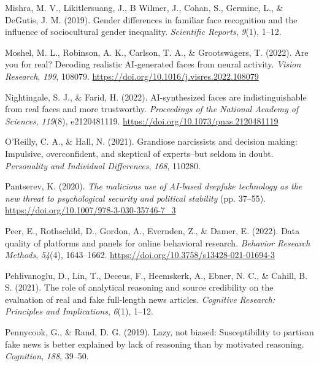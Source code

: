 \documentclass[
  man,floatsintext]{apa6}
\newlength{\cslhangindent}
\newlength{\cslentryspacingunit} %
\newenvironment{CSLReferences}[2] %
 {%
  \setlength{\parindent}{0pt}
  \ifodd #1
  \let\oldpar\par
  \def\par{\hangindent=\cslhangindent\oldpar}
  \fi
  \setlength{\parskip}{#2\cslentryspacingunit}
 }%
 {}
\begin{document}
\begin{CSLReferences}{1}{0}
\leavevmode{}%
Mishra, M. V., Likitlersuang, J., B Wilmer, J., Cohan, S., Germine, L., \& DeGutis, J. M. (2019). Gender differences in familiar face recognition and the influence of sociocultural gender inequality. \emph{Scientific Reports}, \emph{9}(1), 1--12.

\leavevmode{}%
Moshel, M. L., Robinson, A. K., Carlson, T. A., \& Grootswagers, T. (2022). Are you for real? Decoding realistic AI-generated faces from neural activity. \emph{Vision Research}, \emph{199}, 108079. \url{https://doi.org/10.1016/j.visres.2022.108079}

\leavevmode{}%
Nightingale, S. J., \& Farid, H. (2022). AI-synthesized faces are indistinguishable from real faces and more trustworthy. \emph{Proceedings of the National Academy of Sciences}, \emph{119}(8), e2120481119. \url{https://doi.org/10.1073/pnas.2120481119}

\leavevmode{}%
O'Reilly, C. A., \& Hall, N. (2021). Grandiose narcissists and decision making: Impulsive, overconfident, and skeptical of experts--but seldom in doubt. \emph{Personality and Individual Differences}, \emph{168}, 110280.

\leavevmode{}%
Pantserev, K. (2020). \emph{The malicious use of AI-based deepfake technology as the new threat to psychological security and political stability} (pp. 37--55). \url{https://doi.org/10.1007/978-3-030-35746-7_3}

\leavevmode{}%
Peer, E., Rothschild, D., Gordon, A., Evernden, Z., \& Damer, E. (2022). Data quality of platforms and panels for online behavioral research. \emph{Behavior Research Methods}, \emph{54}(4), 1643--1662. \url{https://doi.org/10.3758/s13428-021-01694-3}

\leavevmode{}%
Pehlivanoglu, D., Lin, T., Deceus, F., Heemskerk, A., Ebner, N. C., \& Cahill, B. S. (2021). The role of analytical reasoning and source credibility on the evaluation of real and fake full-length news articles. \emph{Cognitive Research: Principles and Implications}, \emph{6}(1), 1--12.

\leavevmode{}%
Pennycook, G., \& Rand, D. G. (2019). Lazy, not biased: Susceptibility to partisan fake news is better explained by lack of reasoning than by motivated reasoning. \emph{Cognition}, \emph{188}, 39--50.


\end{CSLReferences}
\end{document}
